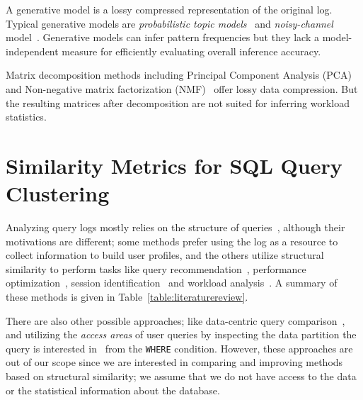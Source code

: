 A generative model is a lossy compressed representation of the original log.
Typical generative models are \textit{probabilistic topic models}~\cite{DBLP:journals/cacm/Blei12,DBLP:conf/acl/WangZLG09} and \textit{noisy-channel} model~\cite{DBLP:journals/ai/KnightM02}.
Generative models can infer pattern frequencies but they lack a model-independent measure for efficiently evaluating overall inference accuracy.

Matrix decomposition methods including Principal Component Analysis (PCA)~\cite{DBLP:reference/stat/Jolliffe11} and Non-negative matrix factorization (NMF)~\cite{lee1999learning} offer lossy data compression.
But the resulting matrices after decomposition are not suited for inferring workload statistics.

\section{Similarity Metrics for SQL Query Clustering}
Analyzing query logs mostly relies on the structure of queries~\cite{Kamra2007SyntaxBased}, although their motivations are different; some methods prefer using the log as a resource to collect information to build user profiles, and the others utilize structural similarity to perform tasks like query recommendation~\cite{giacometti2009, yang2009, chatzopoulou2011querie}, performance optimization~\cite{aouiche2006},  session identification~\cite{aligon2014similarity} and workload analysis~\cite{makiyama2015text}.  A summary of these methods is given in Table~\ref{table:literaturereview}.

There are also other possible approaches; like data-centric query comparison~\cite{Mathew2010Raid}, and utilizing the \textit{access areas} of user queries by inspecting the data partition the query is interested in~\cite{nguyen2015identifying} from the \texttt{WHERE} condition.
However, these approaches are out of our scope
since we are interested in comparing and improving methods based on structural similarity; we assume that
we do not have access to the data or the statistical information about the database. 

